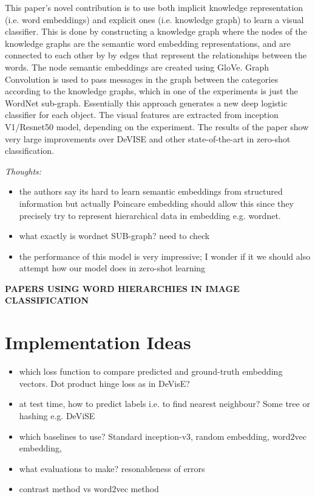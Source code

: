 \documentclass[12pt]{report}
\begin{document}
This paper's novel contribution is to use both implicit knowledge representation (i.e. word embeddings) and explicit ones (i.e. knowledge graph) to learn a visual classifier. This is done by constructing a knowledge graph where the nodes of the knowledge graphs are the semantic word embedding representations, and are connected to each other by by edges that represent the relationships between the words. The node semantic embeddings are created using GloVe. Graph Convolution is used to pass messages in the graph between the categories according to the knowledge graphs, which in one of the experiments is just the WordNet sub-graph. Essentially this approach generates a new deep logistic classifier for each object. The visual features are extracted from inception V1/Resnet50 model, depending on the experiment. The results of the paper show very large improvements over DeVISE and other state-of-the-art in zero-shot classification. 

\textit{Thoughts:}

\begin{itemize}
\item the authors say its hard to learn semantic embeddings from structured information but actually Poincare embedding should allow this since they precisely try to represent hierarchical data in embedding e.g. wordnet.
\item what exactly is wordnet SUB-graph? need to check
\item the performance of this model is very impressive; I wonder if it we should also attempt how our model does in zero-shot learning
\end{itemize}

\newpage

\textbf{PAPERS USING WORD HIERARCHIES IN IMAGE CLASSIFICATION}
\newpage

\chapter{Implementation Ideas}
\begin{itemize}
\item which loss function to compare predicted and ground-truth embedding vectors. Dot product hinge loss as in DeVisE? 
\item at test time, how to predict labels i.e. to find nearest neighbour? Some tree or hashing e.g. DeViSE
\item which baselines to use? Standard inception-v3, random embedding, word2vec embedding, 
\item what evaluations to make? resonableness of errors
\item contrast method vs word2vec method
\end{itemize}
\end{document}

